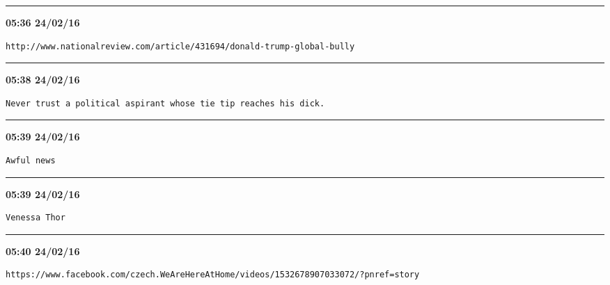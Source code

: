 \hrule%

\begin{adjustwidth}{0cm}{0cm}
\footnotesize \textbf{05:36 24/02/16}

\begin{lstlisting}[breaklines, breakatwhitespace, basicstyle=\small, frame=leftline]
http://www.nationalreview.com/article/431694/donald-trump-global-bully
\end{lstlisting}
\end{adjustwidth}

\hrule%

\begin{adjustwidth}{0cm}{0cm}
\footnotesize \textbf{05:38 24/02/16}

\begin{lstlisting}[breaklines, breakatwhitespace, basicstyle=\small, frame=leftline]
Never trust a political aspirant whose tie tip reaches his dick.
\end{lstlisting}
\end{adjustwidth}

\hrule%

\begin{adjustwidth}{0cm}{0cm}
\footnotesize \textbf{05:39 24/02/16}

\begin{lstlisting}[breaklines, breakatwhitespace, basicstyle=\small, frame=leftline]
Awful news
\end{lstlisting}
\end{adjustwidth}

\hrule%

\begin{adjustwidth}{0cm}{0cm}
\footnotesize \textbf{05:39 24/02/16}

\begin{lstlisting}[breaklines, breakatwhitespace, basicstyle=\small, frame=leftline]
Venessa Thor
\end{lstlisting}
\end{adjustwidth}

\hrule%

\begin{adjustwidth}{0cm}{0cm}
\footnotesize \textbf{05:40 24/02/16}

\begin{lstlisting}[breaklines, breakatwhitespace, basicstyle=\small, frame=leftline]
https://www.facebook.com/czech.WeAreHereAtHome/videos/1532678907033072/?pnref=story
\end{lstlisting}
\end{adjustwidth}

